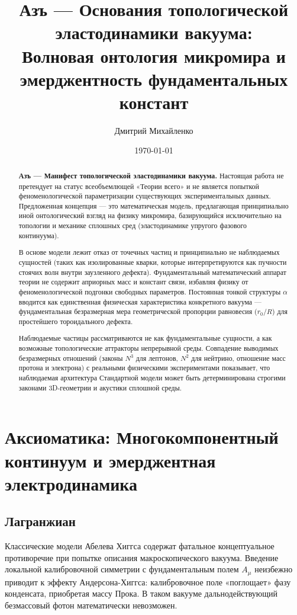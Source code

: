 \documentclass[11pt,a4paper]{article}
\title{\textbf{Азъ — Основания топологической\\ эластодинамики вакуума:\\ Волновая онтология микромира и эмерджентность фундаментальных констант}}
\author{Дмитрий Михайленко}
\date{\today}
\begin{document}
	
	\maketitle
	
	\begin{abstract}
		\textbf{Азъ — Манифест топологической эластодинамики вакуума.} 
		Настоящая работа не претендует на статус всеобъемлющей «Теории всего» и не является попыткой феноменологической параметризации существующих экспериментальных данных. Предложенная концепция — это математическая модель, предлагающая принципиально иной онтологический взгляд на физику микромира, базирующийся исключительно на топологии и механике сплошных сред (эластодинамике упругого фазового континуума).
		
		В основе модели лежит отказ от точечных частиц и принципиально не наблюдаемых сущностей (таких как изолированные кварки, которые интерпретируются как пучности стоячих волн внутри заузленного дефекта). Фундаментальный математический аппарат теории не содержит априорных масс и констант связи, избавляя физику от феноменологической подгонки свободных параметров. Постоянная тонкой структуры $\alpha$ вводится как единственная физическая характеристика конкретного вакуума — фундаментальная безразмерная мера геометрической пропорции равновесия ($r_0/R$) для простейшего тороидального дефекта. 
		
		Наблюдаемые частицы рассматриваются не как фундаментальные сущности, а как возможные топологические аттракторы непрерывной среды. Совпадение выводимых безразмерных отношений (законы $N^3$ для лептонов, $N^2$ для нейтрино, отношение масс протона и электрона) с реальными физическими экспериментами показывает, что наблюдаемая архитектура Стандартной модели может быть детерминирована строгими законами 3D-геометрии и акустики сплошной среды.
	\end{abstract}
	
	\section{Аксиоматика: Многокомпонентный континуум и эмерджентная электродинамика}
	
	\subsection{Лагранжиан}
	Классические модели Абелева Хиггса содержат фатальное концептуальное противоречие при попытке описания макроскопического вакуума. Введение локальной калибровочной симметрии с фундаментальным полем $A_\mu$ неизбежно приводит к эффекту Андерсона-Хиггса: калибровочное поле «поглощает» фазу конденсата, приобретая массу Прока. В таком вакууме дальнодействующий безмассовый фотон математически невозможен.
	
\end{document}
